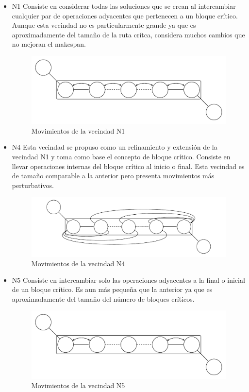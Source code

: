 \begin{itemize}
\item N1 \cite{blazewicz1996job} Consiste en considerar todas las soluciones que se crean al intercambiar cualquier par de operaciones adyacentes que pertenecen a un bloque crítico. Aunque esta vecindad no es particularmente grande ya que es aproximadamente del tamaño de la ruta crítca, considera muchos cambios que no mejoran el makespan.
\begin{figure}[H]
\centering
\includegraphics[scale=.7]{Imagenes/N1.pdf}
\caption{Movimientos de la vecindad N1}
\end{figure}

\item N4 \cite{dell1993applying} Esta vecindad se propuso como un refinamiento y extensión de la vecindad N1 y toma como base el concepto de bloque crítico. Consiste en llevar operaciones internas del bloque crítico al inicio o final. Esta vecindad es de tamaño comparable a la anterior pero presenta movimientos más perturbativos.
\begin{figure}[H]
\centering
\includegraphics[scale=.7]{Imagenes/N4.pdf}
\caption{Movimientos de la vecindad N4}
\end{figure}


\item N5 \cite{EugeniuszNowicki2003} Consiste en intercambiar solo las operaciones adyacentes a la final o inicial de un bloque crítico.  Es aun más pequeña que la anterior ya que es aproximadamente del tamaño del número de bloques críticos.  
\begin{figure}[H]
\centering
\includegraphics[scale=.7]{Imagenes/N5.pdf}
\caption{Movimientos de la vecindad N5}
\end{figure}


\end{itemize}
